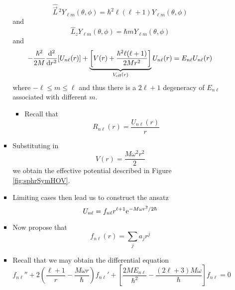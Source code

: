 \documentclass[../notes.tex]{subfiles}
\begin{document}
\begin{itemize}
\begin{itemize}
\begin{itemize}
\begin{equation*}
                \hat{\vec{L}}{\,}^2Y_{\ell m}(\theta,\phi) = \hbar^2\ell(\ell+1)Y_{\ell m}(\theta,\phi)
            \end{equation*}
            and
            \begin{equation*}
                \hat{L}_zY_{\ell m}(\theta,\phi) = \hbar mY_{\ell m}(\theta,\phi)
            \end{equation*}
            and
            \begin{equation*}
                -\frac{\hbar^2}{2M}\dv[2]{r}[U_{n\ell}(r)]+\underbrace{\left[ V(r)+\frac{\hbar^2\ell(\ell+1)}{2Mr^2} \right]}_{V_\text{eff}(r)}U_{n\ell}(r) = E_{n\ell}U_{n\ell}(r)
            \end{equation*}
            where $-\ell\leq m\leq\ell$ and thus there is a $2\ell+1$ degeneracy of $E_{n\ell}$ associated with different $m$.
            \begin{itemize}
                \item Recall that
                \begin{equation*}
                    R_{n\ell}(r) = \frac{U_{n\ell}(r)}{r}
                \end{equation*}
            \end{itemize}
            \item Substituting in
            \begin{equation*}
                V(r) = \frac{M\omega^2r^2}{2}
            \end{equation*}
            we obtain the effective potential described in Figure \ref{fig:sphrSymHOV}.
            \item Limiting cases then lead us to construct the ansatz
            \begin{equation*}
                U_{n\ell} = f_{n\ell}r^{\ell+1}\e[-M\omega r^2/2\hbar]
            \end{equation*}
            \item Now propose that
            \begin{equation*}
                f_{n\ell}(r) = \sum_ja_jr^j
            \end{equation*}
            \item Recall that we may obtain the differential equation
            \begin{equation*}
                f_{n\ell}''+2\left( \frac{\ell+1}{r}-\frac{M\omega r}{\hbar} \right)f_{n\ell}'+\left[ \frac{2ME_{n\ell}}{\hbar^2}-\frac{(2\ell+3)M\omega}{\hbar} \right]f_{n\ell} = 0
            \end{equation*}

\end{itemize}
\end{itemize}
\end{itemize}
\end{document}
